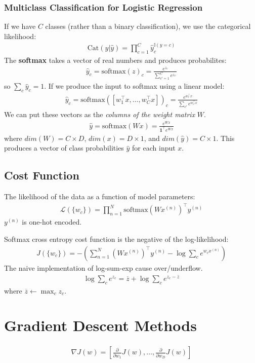 \documentclass{article}
\begin{document}
\subsubsection{Multiclass Classification for Logistic Regression}
If we have $C$ classes (rather than a binary classification), we use the categorical likelihood:
\begin{align}
    \text{Cat}(y | \hat{y}) = \prod_{c=1}^C \hat{y}_c^{\mathbb{I}(y=c)}
\end{align}
The \textbf{softmax} takes a vector of real numbers and produces probabilites:
\begin{align}
    \hat{y}_c = \text{softmax}(z)_c = \frac{e^{z_c}}{\sum_{c'=1}^C e^{z_{c'}}}
\end{align}
so $\sum_c \hat{y}_c = 1$. If we produce the input to softmax using a linear model:
\begin{align}
    \hat{y}_c = \text{softmax}([w_1^\top x, \ldots, w_C^\top x])_c = \frac{e^{w_c^\top x}}{\sum_{c'}e^{w_{c'}^\top x}}
\end{align}
We can put these vectors as the \textit{columns of the weight matrix} $W$.
\begin{align}
    \hat{y} = \text{softmax}(Wx) = \frac{e^{Wx}}{\mathbf{1}^\top e^{Wx}}
\end{align}
where $dim(W) = C \times D$, $dim(x) = D \times 1$, and $dim (\hat{y}) = C \times 1$. This produces a vector of class probabilities $\hat{y}$ for each input $x$.
\subsection{Cost Function}
The likelihood of the data as a function of model parameters:
\begin{align}
    \mathcal{L}(\{w_c\}) = \prod_{n=1}^N \text{softmax}(Wx^{(n)})^\top y^{(n)}
\end{align}
$y^{(n)}$ is one-hot encoded.

\noindent Softmax cross entropy cost function is the negative of the log-likelihood:
\begin{align}
    J(\{w_c\}) = -\left(\sum_{n=1}^N (Wx^{(n)})^\top y^{(n)} - \log\sum_c e^{w_c x^{(n)}}\right)
\end{align}
The naive implementation of log-sum-exp cause over/underflow.
\begin{align}
    \log\sum_ce^{z_c} = \overline{z} + \log\sum_c e^{z_c - \overline{z}}
\end{align}
where $\overline{z} \leftarrow \max_c z_c$.
\section{Gradient Descent Methods}
\begin{align}
    \nabla J(w) = \left[\frac{\partial}{\partial w_1}J(w), \ldots, \frac{\partial}{\partial w_D}J(w)\right]
\end{align}
\end{document}
